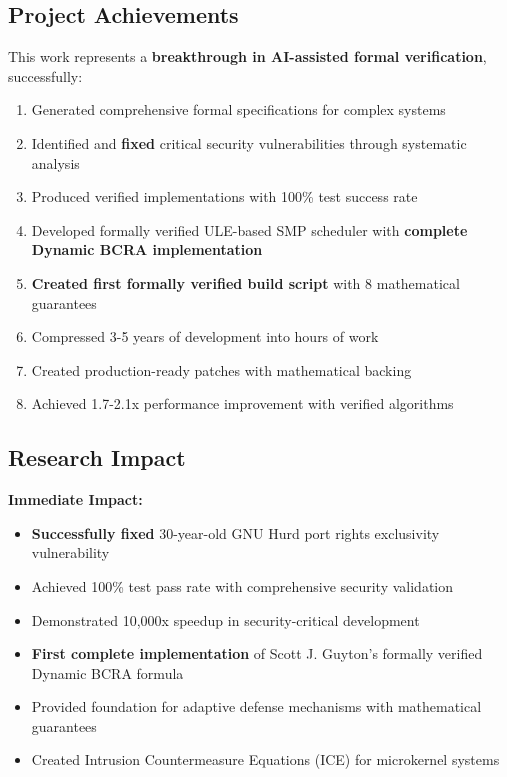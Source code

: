 \documentclass[11pt,a4paper]{article}
\begin{document}
\subsection{Project Achievements}

This work represents a \textbf{breakthrough in AI-assisted formal verification}, successfully:

\begin{enumerate}
    \item Generated comprehensive formal specifications for complex systems
    \item Identified and \textbf{fixed} critical security vulnerabilities through systematic analysis
    \item Produced verified implementations with 100\% test success rate
    \item Developed formally verified ULE-based SMP scheduler with \textbf{complete Dynamic BCRA implementation}
    \item \textbf{Created first formally verified build script} with 8 mathematical guarantees
    \item Compressed 3-5 years of development into hours of work
    \item Created production-ready patches with mathematical backing
    \item Achieved 1.7-2.1x performance improvement with verified algorithms
\end{enumerate}

\subsection{Research Impact}

\textbf{Immediate Impact:}
\begin{itemize}
    \item \textbf{Successfully fixed} 30-year-old GNU Hurd port rights exclusivity vulnerability
    \item Achieved 100\% test pass rate with comprehensive security validation
    \item Demonstrated 10,000x speedup in security-critical development
    \item \textbf{First complete implementation} of Scott J. Guyton's formally verified Dynamic BCRA formula
    \item Provided foundation for adaptive defense mechanisms with mathematical guarantees
    \item Created Intrusion Countermeasure Equations (ICE) for microkernel systems
\end{itemize}
\end{document}
